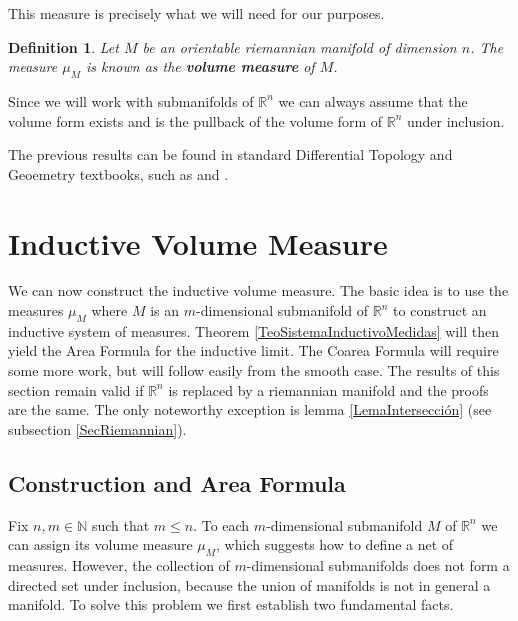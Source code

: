 \documentclass[%
 aip,
 amsmath,amssymb,
 reprint,%
jmp]{revtex4-2}
\newtheorem*{definition}{Definition}
\begin{document}
This measure is precisely what we will need for our purposes.

\begin{definition}
Let $M$ be an orientable riemannian manifold of dimension $n$. The measure $\mu_{M}$ is known as the \textbf{volume measure} of $M$.
\end{definition}

Since we will work with submanifolds of $\mathbb{R}^{n}$ we can always assume that the volume form exists and is the pullback of the volume form of $\mathbb{R}^{n}$ under inclusion.

The previous results can be found in standard Differential Topology and Geoemetry textbooks, such as \cite{Lee} and \cite{Tu}.

\section{Inductive Volume Measure}

We can now construct the inductive volume measure. The basic idea is to use the measures $\mu_{M}$ where $M$ is an $m$-dimensional submanifold of $\mathbb{R}^{n}$ to construct an inductive system of measures.  Theorem \ref{TeoSistemaInductivoMedidas} will then yield the Area Formula for the inductive limit. The Coarea Formula will require some more work, but will follow easily from the smooth case. The results of this section remain valid if $\mathbb{R}^{n}$ is replaced by a riemannian manifold and the proofs are the same. The only noteworthy exception is lemma \ref{LemaIntersección} (see subsection \ref{SecRiemannian}).

\subsection{Construction and Area Formula}

Fix $n,m\in\mathbb{N}$ such that $m\leq n$. To each $m$-dimensional submanifold $M$ of $\mathbb{R}^{n}$ we can assign its volume measure $\mu_{M}$, which suggests how to define a net of measures. However, the collection of $m$-dimensional submanifolds does not form a directed set under inclusion, because the union of manifolds is not in general a manifold. To solve this problem we first establish two fundamental facts.
\end{document}
